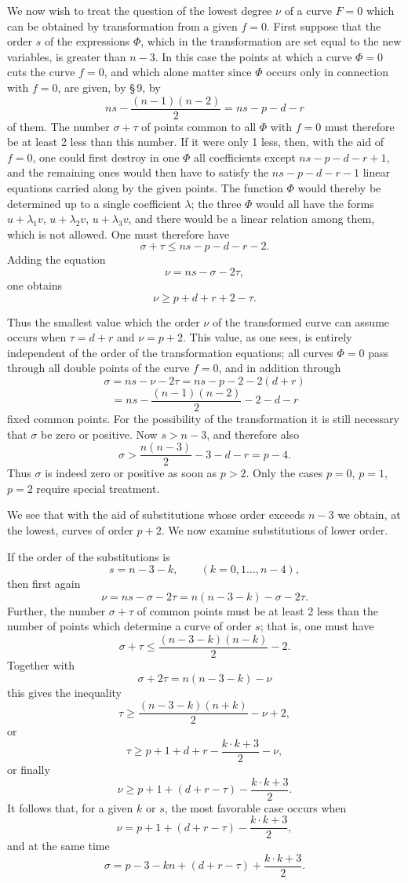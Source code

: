 \documentclass[10pt]{article}
\begin{document}
We now wish to treat the question of the lowest degree \(\nu\) of a curve \(F=0\) which can be obtained by transformation from a given \(f=0\). First suppose that the order \(s\) of the expressions \(\Phi\), which in the transformation are set equal to the new variables, is greater than \(n-3\). In this case the points at which a curve \(\Phi=0\) cuts the curve \(f=0\), and which alone matter since \(\Phi\) occurs only in connection with \(f=0\), are given, by \S\,9, by
\[
ns-\frac{(n-1)(n-2)}{2}=ns-p-d-r
\]
of them. The number \(\sigma+\tau\) of points common to all \(\Phi\) with \(f=0\) must therefore be at least 2 less than this number. If it were only 1 less, then, with the aid of \(f=0\), one could first destroy in one \(\Phi\) all coefficients except \(ns-p-d-r+1\), and the remaining ones would then have to satisfy the \(ns-p-d-r-1\) linear equations carried along by the given points. The function \(\Phi\) would thereby be determined up to a single coefficient \(\lambda\); the three \(\Phi\) would all have the forms \(u+\lambda_1v\), \(u+\lambda_2v\), \(u+\lambda_3v\), and there would be a linear relation among them, which is not allowed. One must therefore have
\[
\sigma+\tau\le ns-p-d-r-2.
\]
Adding the equation
\[
\nu=ns-\sigma-2\tau,
\]
one obtains
\[
\nu\ge p+d+r+2-\tau.
\]

Thus the smallest value which the order \(\nu\) of the transformed curve can assume occurs when \(\tau=d+r\) and \(\nu=p+2\). This value, as one sees, is entirely independent of the order of the transformation equations; all curves \(\Phi=0\) pass through all double points of the curve \(f=0\), and in addition through
\[
\sigma=ns-\nu-2\tau=ns-p-2-2(d+r)
\]
\[
=ns-\frac{(n-1)(n-2)}{2}-2-d-r
\]
fixed common points. For the possibility of the transformation it is still necessary that \(\sigma\) be zero or positive. Now \(s>n-3\), and therefore also
\[
\sigma>\frac{n(n-3)}{2}-3-d-r=p-4.
\]
Thus \(\sigma\) is indeed zero or positive as soon as \(p>2\). Only the cases \(p=0\), \(p=1\), \(p=2\) require special treatment.

We see that with the aid of substitutions whose order exceeds \(n-3\) we obtain, at the lowest, curves of order \(p+2\). We now examine substitutions of lower order.

If the order of the substitutions is
\[
s=n-3-k,\qquad (k=0,1\ldots,n-4),
\]
then first again
\[
\nu=ns-\sigma-2\tau=n(n-3-k)-\sigma-2\tau.
\]
Further, the number \(\sigma+\tau\) of common points must be at least 2 less than the number of points which determine a curve of order \(s\); that is, one must have
\[
\sigma+\tau\le \frac{(n-3-k)(n-k)}{2}-2.
\]
Together with
\[
\sigma+2\tau=n(n-3-k)-\nu
\]
this gives the inequality
\[
\tau\ge \frac{(n-3-k)(n+k)}{2}-\nu+2,
\]
or
\[
\tau\ge p+1+d+r-\frac{k\cdot k+3}{2}-\nu,
\]
or finally
\[
\nu\ge p+1+(d+r-\tau)-\frac{k\cdot k+3}{2}.
\]
It follows that, for a given \(k\) or \(s\), the most favorable case occurs when
\[
\nu=p+1+(d+r-\tau)-\frac{k\cdot k+3}{2},
\]
and at the same time
\[
\sigma=p-3-kn+(d+r-\tau)+\frac{k\cdot k+3}{2}.
\]
\end{document}

